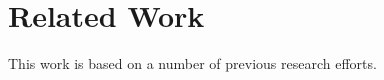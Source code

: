 
\chapter{Related Work\label{ch:pastwork}}

This work is based on a number of previous research efforts.




